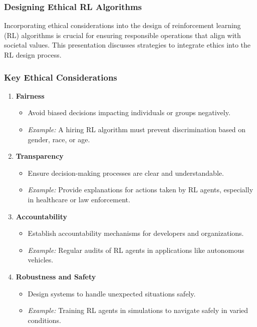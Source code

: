 \documentclass[aspectratio=169]{beamer}
\begin{document}
\begin{frame}[fragile]
    \frametitle{Designing Ethical RL Algorithms}
    Incorporating ethical considerations into the design of reinforcement learning (RL) algorithms is crucial for ensuring responsible operations that align with societal values. This presentation discusses strategies to integrate ethics into the RL design process.
\end{frame}

\begin{frame}[fragile]
    \frametitle{Key Ethical Considerations}
    
    \begin{enumerate}
        \item \textbf{Fairness}
        \begin{itemize}
            \item Avoid biased decisions impacting individuals or groups negatively.
            \item \textit{Example:} A hiring RL algorithm must prevent discrimination based on gender, race, or age.
        \end{itemize}

        \item \textbf{Transparency}
        \begin{itemize}
            \item Ensure decision-making processes are clear and understandable.
            \item \textit{Example:} Provide explanations for actions taken by RL agents, especially in healthcare or law enforcement.
        \end{itemize}

        \item \textbf{Accountability}
        \begin{itemize}
            \item Establish accountability mechanisms for developers and organizations.
            \item \textit{Example:} Regular audits of RL agents in applications like autonomous vehicles.
        \end{itemize}

        \item \textbf{Robustness and Safety}
        \begin{itemize}
            \item Design systems to handle unexpected situations safely.
            \item \textit{Example:} Training RL agents in simulations to navigate safely in varied conditions.
        \end{itemize}


\end{enumerate}
\end{frame}
\end{document}
